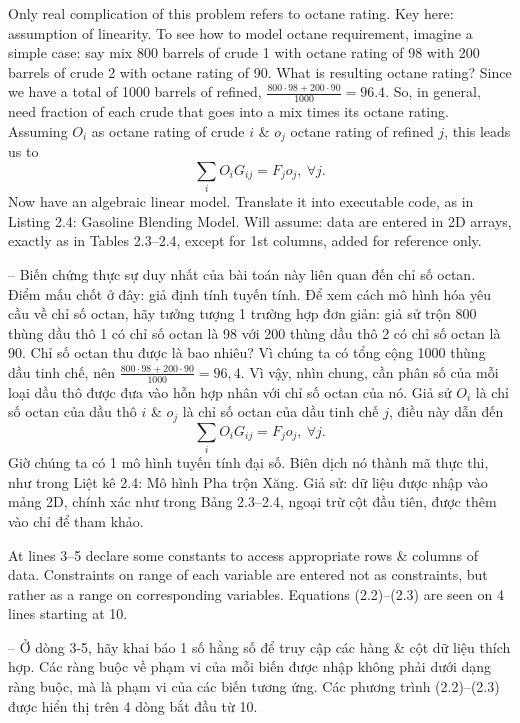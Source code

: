 \documentclass{article}
\begin{document}
\begin{itemize}
\begin{itemize}
\begin{itemize}
            Only real complication of this problem refers to octane rating. Key here: assumption of linearity. To see how to model octane requirement, imagine a simple case: say mix 800 barrels of crude 1 with octane rating of 98 with 200 barrels of crude 2 with octane rating of 90. What is resulting octane rating? Since we have a total of 1000 barrels of refined, $\frac{800\cdot98 + 200\cdot90}{1000} = 96.4$. So, in general, need fraction of each crude that goes into a mix times its octane rating. Assuming $O_i$ as octane rating of crude $i$ \& $o_j$ octane rating of refined $j$, this leads us to
            \begin{equation*}
                \sum_i O_iG_{ij} = F_jo_j,\ \forall j.
            \end{equation*}
            Now have an algebraic linear model. Translate it into executable code, as in {\sf Listing 2.4: Gasoline Blending Model}. Will assume: data are entered in 2D arrays, exactly as in Tables 2.3--2.4, except for 1st columns, added for reference only.

            -- Biến chứng thực sự duy nhất của bài toán này liên quan đến chỉ số octan. Điểm mấu chốt ở đây: giả định tính tuyến tính. Để xem cách mô hình hóa yêu cầu về chỉ số octan, hãy tưởng tượng 1 trường hợp đơn giản: giả sử trộn 800 thùng dầu thô 1 có chỉ số octan là 98 với 200 thùng dầu thô 2 có chỉ số octan là 90. Chỉ số octan thu được là bao nhiêu? Vì chúng ta có tổng cộng 1000 thùng dầu tinh chế, nên $\frac{800\cdot98 + 200\cdot90}{1000} = 96,4$. Vì vậy, nhìn chung, cần phân số của mỗi loại dầu thô được đưa vào hỗn hợp nhân với chỉ số octan của nó. Giả sử $O_i$ là chỉ số octan của dầu thô $i$ \& $o_j$ là chỉ số octan của dầu tinh chế $j$, điều này dẫn đến
            \begin{equation*}
                \sum_i O_iG_{ij} = F_jo_j,\ \forall j.
            \end{equation*}
            Giờ chúng ta có 1 mô hình tuyến tính đại số. Biên dịch nó thành mã thực thi, như trong {\sf Liệt kê 2.4: Mô hình Pha trộn Xăng}. Giả sử: dữ liệu được nhập vào mảng 2D, chính xác như trong Bảng 2.3--2.4, ngoại trừ cột đầu tiên, được thêm vào chỉ để tham khảo.

            At lines 3--5 declare some constants to access appropriate rows \& columns of data. Constraints on range of each variable are entered not as constraints, but rather as a range on corresponding variables. Equations (2.2)--(2.3) are seen on 4 lines starting at 10.

            -- Ở dòng 3-5, hãy khai báo 1 số hằng số để truy cập các hàng \& cột dữ liệu thích hợp. Các ràng buộc về phạm vi của mỗi biến được nhập không phải dưới dạng ràng buộc, mà là phạm vi của các biến tương ứng. Các phương trình (2.2)--(2.3) được hiển thị trên 4 dòng bắt đầu từ 10.


\end{itemize}
\end{itemize}
\end{itemize}
\end{document}
